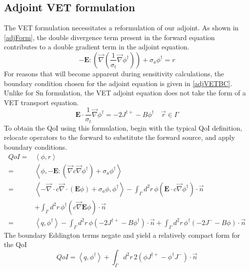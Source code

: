 \documentclass{article}
\newcommand{\vr}{\vec{r}}
\newcommand{\bra}{\left\langle}
\newcommand{\ket}{\right\rangle}
\newcommand{\vdiv}{\vec{\nabla} \cdot}
\newcommand{\vgrad}{\vec{\nabla}}
\newcommand{\Edd}{\mathbf{E}}
\newcommand{\sigt}{\sigma_t}
\newcommand{\siga}{\sigma_a}
\newcommand{\isigt}{c}
\newcommand{\scalSource}{q}
\newcommand{\scalResp}{r}
\begin{document}
\subsection{Adjoint VET formulation}

The VET formulation necessitates a reformulation of our adjoint. As shown in \ref{adjForm}, the double divergence term present in the forward equation contributes to a double gradient term in the adjoint equation.
\begin{equation}
\label{adjForm}
- \Edd : \left( \vgrad \left( \frac{1}{\sigt}\vgrad \phi^\dag \right) \right) + \siga \phi^\dag = \scalResp
\end{equation}
For reasons that will become apparent during sensitivity calculations, the boundary condition chosen for the adjoint equation is given in \ref{adjVETBC}. Unlike for Sn formulation, the VET adjoint equation does not take the form of a VET transport equation.
\begin{equation}
\label{adjVETBC}
\Edd \cdot \frac{1}{\sigma_{t} } \vec{\nabla} \phi^\dag  = - 2J^{\dag +} - B \phi^\dag \quad \vr \in \Gamma
\end{equation}
To obtain the QoI using this formulation, begin with the typical QoI definition, relocate operators to the forward to substitute the forward source, and apply boundary conditions.
\begin{equation}
\label{VETQoIAdjUnpDeriv}
\begin{split}
QoI=&\bra \phi , \scalResp \ket \\
=&\bra \phi , - \Edd : \left( \vgrad \isigt \vgrad \phi^\dag \right) + \siga \phi^\dag \ket \\
=& \bra - \vdiv \isigt \vdiv \left( \Edd \phi \right) + \siga \phi, \phi^\dag \ket 
- \int_\Gamma d^2 r \, \phi \left( \Edd \cdot \isigt \vgrad \phi^\dag \right) \cdot \vec{n}  \\ 
&+ \int_\Gamma d^2 r \, \phi^\dag \left(  \isigt \vgrad \Edd \phi \right) \cdot \vec{n} \\
=&\bra \scalSource , \phi^\dag \ket 
- \int_\Gamma d^2 r \, \phi \left( - 2J^{\dag +} - B \phi^\dag \right) \cdot \vec{n} + \int_\Gamma d^2 r \, \phi^\dag \left( - 2J^- - B \phi  \right) \cdot \vec{n}
\end{split}
\end{equation}
The boundary Eddington terms negate and yield a relatively compact form for the QoI
\begin{equation}
\label{VETQoIAdj}
QoI=\bra \scalSource , \phi^\dag \ket 
+ \int_\Gamma d^2 r \, 2  \left( \phi J^{\dag +}  - \phi^\dag J^- \right) \cdot \vec{n}
\end{equation}
\end{document}
